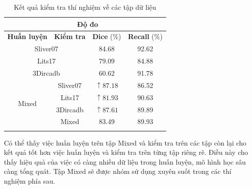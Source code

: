 \begin{table}[H]
\renewcommand{\arraystretch}{1.2}
\centering
\begin{tabular}{c|c|c|c}
\Xhline{3\arrayrulewidth}
\multicolumn{2}{c|}{\textbf{Thí nghiệm}} & \multicolumn{2}{c}{\textbf{Độ đo}}       \\ \hline
\textbf{Huấn luyện  }               & \textbf{Kiểm tra}     & \textbf{Dice} (\%) & \textbf{Recall} (\%) \\ \hline
\multicolumn{2}{c|}{Sliver07}          & 84.68                         & 92.62                           \\ \hline
\multicolumn{2}{c|}{Lits17}            & 79.09                         & 84.88                           \\ \hline
\multicolumn{2}{c|}{3Dircadb}          & 60.62                         & 91.78                           \\ \hline
\multirow{4}{*}{Mixed} & Sliver07          & $\uparrow 87.18$                         & 86.52                           \\ \cline{2-4} 
                       & Lits17            & $\uparrow 81.93$                         & 90.63                           \\ \cline{2-4} 
                       & 3Dircadb          & $\uparrow 87.61$                         & 89.89                           \\ \cline{2-4} 
                       & Mixed             & 83.49                         & 89.93                           \\ 
\Xhline{3\arrayrulewidth}
\end{tabular}
\caption{Kết quả kiểm tra thí nghiệm về các tập dữ liệu}
\end{table}

Có thể thấy việc huấn luyện trên tập Mixed và kiểm tra trên các tập còn lại cho kết quả tốt hơn việc huấn luyện và kiểm tra trên từng tập riêng rẽ. Điều này cho thấy hiệu quả của việc có càng nhiều dữ liệu trong huấn luyện, mô hình học sâu càng tổng quát. Tập Mixed sẽ được nhóm sử dụng xuyên suốt trong các thí nghiệm phía sau.

